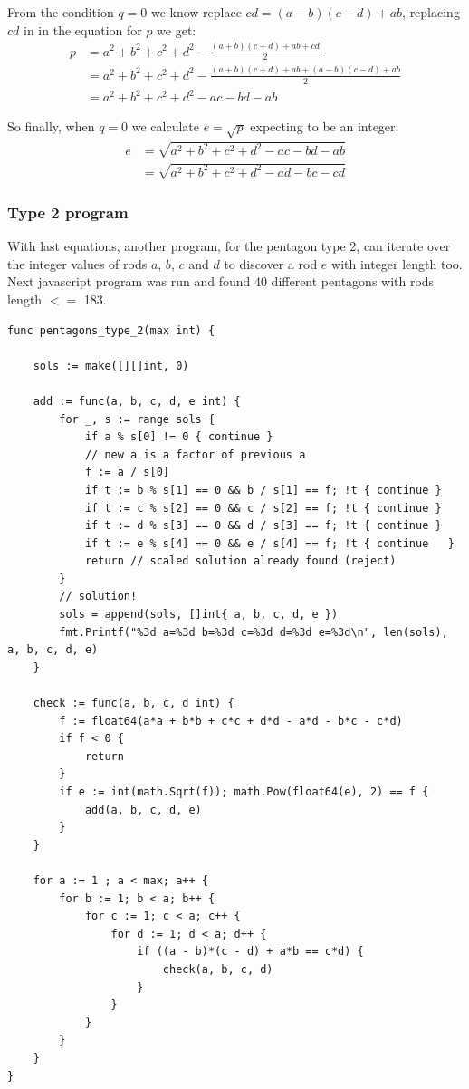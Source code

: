 \documentclass[11pt]{article}
\begin{document}
From the condition $q=0$ we know replace $cd = (a-b)(c-d)+ab$, replacing $cd$ in 
in the equation for $p$ we get:
\begin{align*}
p &= a^2+b^2+c^2+d^2 - \frac{(a+b)(c+d)+ab+cd}{2}\\
  &= a^2+b^2+c^2+d^2 - \frac{(a+b)(c+d)+ab+(a-b)(c-d)+ab}{2}\\
  &= a^2+b^2+c^2+d^2 -ac -bd -ab
\end{align*}

So finally, when $q=0$ we calculate $e = \sqrt{p}$ expecting to be an integer:
\begin{align*}
e &= \sqrt{a^2 + b^2 + c^2 + d^2 -ac -bd - ab}\\
  &= \sqrt{a^2 + b^2 + c^2 + d^2 -ad -bc - cd}
\end{align*}


\subsubsection{Type 2 program}

With last equations, another program, for the pentagon type 2, can iterate over the integer values of rods $a$, $b$, $c$ and $d$ to discover a rod $e$ with integer length too. Next javascript program was run and found 40 different pentagons with rods length $<=$ 183.

\begin{lstlisting}
func pentagons_type_2(max int) {

	sols := make([][]int, 0)

	add := func(a, b, c, d, e int) {
		for _, s := range sols {
			if a % s[0] != 0 { continue }
			// new a is a factor of previous a
			f := a / s[0]
			if t := b % s[1] == 0 && b / s[1] == f; !t { continue }
			if t := c % s[2] == 0 && c / s[2] == f; !t { continue }
			if t := d % s[3] == 0 && d / s[3] == f; !t { continue }
			if t := e % s[4] == 0 && e / s[4] == f; !t { continue	}
			return // scaled solution already found (reject)
		}
		// solution!
		sols = append(sols, []int{ a, b, c, d, e })
		fmt.Printf("%3d a=%3d b=%3d c=%3d d=%3d e=%3d\n", len(sols), a, b, c, d, e)
	}

	check := func(a, b, c, d int) {
		f := float64(a*a + b*b + c*c + d*d - a*d - b*c - c*d)
	    if f < 0 {
	    	return
	    }
		if e := int(math.Sqrt(f)); math.Pow(float64(e), 2) == f {
			add(a, b, c, d, e)
		}
	}

    for a := 1 ; a < max; a++ {
    	for b := 1; b < a; b++ {
        	for c := 1; c < a; c++ {
          		for d := 1; d < a; d++ {
            		if ((a - b)*(c - d) + a*b == c*d) {
              			check(a, b, c, d)
              		}
              	}
            }
        }
    }
}
\end{lstlisting}
\end{document}

